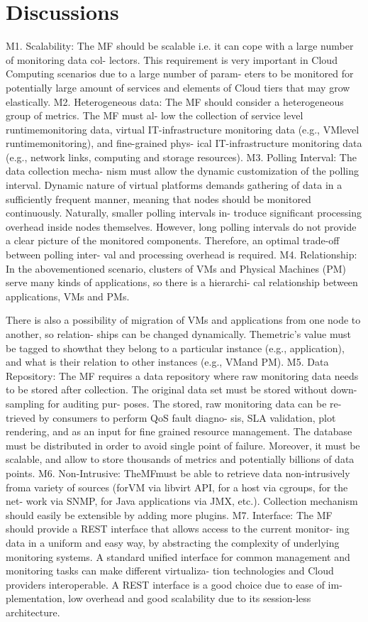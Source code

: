 \section{Discussions}

M1. Scalability: The MF should be scalable i.e. it can cope with a large number of monitoring data col- lectors. This requirement is very important in Cloud Computing scenarios due to a large number of param- eters to be monitored for potentially large amount of services and elements of Cloud tiers that may grow elastically. M2. Heterogeneous data: The MF should consider a heterogeneous group of metrics. The MF must al- low the collection of service level runtimemonitoring data, virtual IT-infrastructure monitoring data (e.g., VMlevel runtimemonitoring), and fine-grained phys- ical IT-infrastructure monitoring data (e.g., network links, computing and storage resources). M3. Polling Interval: The data collection mecha- nism must allow the dynamic customization of the polling interval. Dynamic nature of virtual platforms demands gathering of data in a sufficiently frequent manner, meaning that nodes should be monitored continuously. Naturally, smaller polling intervals in- troduce significant processing overhead inside nodes themselves. However, long polling intervals do not provide a clear picture of the monitored components. Therefore, an optimal trade-off between polling inter- val and processing overhead is required. M4. Relationship: In the abovementioned scenario, clusters of VMs and Physical Machines (PM) serve many kinds of applications, so there is a hierarchi- cal relationship between applications, VMs and PMs.

There is also a possibility of migration of VMs and applications from one node to another, so relation- ships can be changed dynamically. Themetric’s value must be tagged to showthat they belong to a particular instance (e.g., application), and what is their relation to other instances (e.g., VMand PM). M5. Data Repository: The MF requires a data repository where raw monitoring data needs to be stored after collection. The original data set must be stored without down-sampling for auditing pur- poses. The stored, raw monitoring data can be re- trieved by consumers to perform QoS fault diagno- sis, SLA validation, plot rendering, and as an input for fine grained resource management. The database must be distributed in order to avoid single point of failure. Moreover, it must be scalable, and allow to store thousands of metrics and potentially billions of data points. M6. Non-Intrusive: TheMFmust be able to retrieve data non-intrusively froma variety of sources (forVM via libvirt API, for a host via cgroups, for the net- work via SNMP, for Java applications via JMX, etc.). Collection mechanism should easily be extensible by adding more plugins. M7. Interface: The MF should provide a REST interface that allows access to the current monitor- ing data in a uniform and easy way, by abstracting the complexity of underlying monitoring systems. A standard unified interface for common management and monitoring tasks can make different virtualiza- tion technologies and Cloud providers interoperable. A REST interface is a good choice due to ease of im- plementation, low overhead and good scalability due to its session-less architecture.